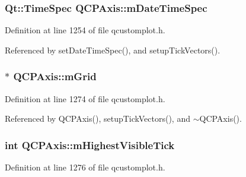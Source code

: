 \hypertarget{class_q_c_p_axis_af73bec228c1a3203dc8aef1e84a46759}{}
\subsubsection[{m\+Date\+Time\+Spec}]{\setlength{\rightskip}{0pt plus 5cm}Qt\+::\+Time\+Spec Q\+C\+P\+Axis\+::m\+Date\+Time\+Spec\hspace{0.3cm}{\ttfamily [protected]}}\label{class_q_c_p_axis_af73bec228c1a3203dc8aef1e84a46759}


Definition at line 1254 of file qcustomplot.\+h.



Referenced by set\+Date\+Time\+Spec(), and setup\+Tick\+Vectors().

\hypertarget{class_q_c_p_axis_a17bffb94aaa40311f259c6ac7bcb5d5f}{}
\subsubsection[{m\+Grid}]{$\ast$ Q\+C\+P\+Axis\+::m\+Grid\hspace{0.3cm}{\ttfamily [protected]}}\label{class_q_c_p_axis_a17bffb94aaa40311f259c6ac7bcb5d5f}


Definition at line 1274 of file qcustomplot.\+h.



Referenced by Q\+C\+P\+Axis(), setup\+Tick\+Vectors(), and $\sim$\+Q\+C\+P\+Axis().

\hypertarget{class_q_c_p_axis_abb3b3ccce7e9779fef2be91ce1a46ef0}{}
\subsubsection[{m\+Highest\+Visible\+Tick}]{\setlength{\rightskip}{0pt plus 5cm}int Q\+C\+P\+Axis\+::m\+Highest\+Visible\+Tick\hspace{0.3cm}{\ttfamily [protected]}}\label{class_q_c_p_axis_abb3b3ccce7e9779fef2be91ce1a46ef0}


Definition at line 1276 of file qcustomplot.\+h.



